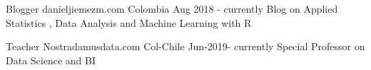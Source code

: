 

\begin{cventries}

  \cventry
    {Blogger} %
    {danieljiemezm.com} %
    {Colombia} %
    {Aug 2018 - currently } %
    {Blog on Applied Statistics , Data Analysis and Machine Learning with R}
    
   \cventry
   {Teacher}
   {Nostradamusdata.com}
   {Col-Chile}
   {Jun-2019- currently }
   {Special Professor on Data Science and BI}

\end{cventries}
